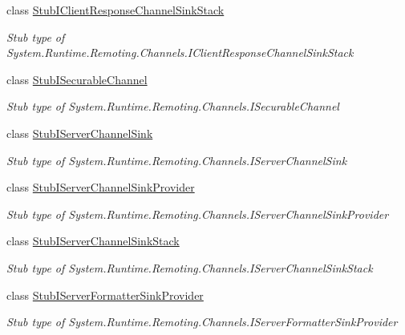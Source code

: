 \begin{DoxyCompactItemize}
class \hyperlink{class_system_1_1_runtime_1_1_remoting_1_1_channels_1_1_fakes_1_1_stub_i_client_response_channel_sink_stack}{Stub\-I\-Client\-Response\-Channel\-Sink\-Stack}
\begin{DoxyCompactList}\small\item\em Stub type of System.\-Runtime.\-Remoting.\-Channels.\-I\-Client\-Response\-Channel\-Sink\-Stack\end{DoxyCompactList}\item 
class \hyperlink{class_system_1_1_runtime_1_1_remoting_1_1_channels_1_1_fakes_1_1_stub_i_securable_channel}{Stub\-I\-Securable\-Channel}
\begin{DoxyCompactList}\small\item\em Stub type of System.\-Runtime.\-Remoting.\-Channels.\-I\-Securable\-Channel\end{DoxyCompactList}\item 
class \hyperlink{class_system_1_1_runtime_1_1_remoting_1_1_channels_1_1_fakes_1_1_stub_i_server_channel_sink}{Stub\-I\-Server\-Channel\-Sink}
\begin{DoxyCompactList}\small\item\em Stub type of System.\-Runtime.\-Remoting.\-Channels.\-I\-Server\-Channel\-Sink\end{DoxyCompactList}\item 
class \hyperlink{class_system_1_1_runtime_1_1_remoting_1_1_channels_1_1_fakes_1_1_stub_i_server_channel_sink_provider}{Stub\-I\-Server\-Channel\-Sink\-Provider}
\begin{DoxyCompactList}\small\item\em Stub type of System.\-Runtime.\-Remoting.\-Channels.\-I\-Server\-Channel\-Sink\-Provider\end{DoxyCompactList}\item 
class \hyperlink{class_system_1_1_runtime_1_1_remoting_1_1_channels_1_1_fakes_1_1_stub_i_server_channel_sink_stack}{Stub\-I\-Server\-Channel\-Sink\-Stack}
\begin{DoxyCompactList}\small\item\em Stub type of System.\-Runtime.\-Remoting.\-Channels.\-I\-Server\-Channel\-Sink\-Stack\end{DoxyCompactList}\item 
class \hyperlink{class_system_1_1_runtime_1_1_remoting_1_1_channels_1_1_fakes_1_1_stub_i_server_formatter_sink_provider}{Stub\-I\-Server\-Formatter\-Sink\-Provider}
\begin{DoxyCompactList}\small\item\em Stub type of System.\-Runtime.\-Remoting.\-Channels.\-I\-Server\-Formatter\-Sink\-Provider\end{DoxyCompactList}\item 

\end{DoxyCompactItemize}
